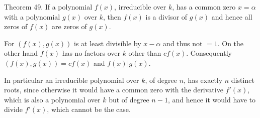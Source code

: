 Theorem 49. If a polynomial $f(x)$, irreducible over $k$, has a common zero $x = \alpha$ with a polynomial $g(x)$ over $k$, then $f(x)$ is a divisor of $g(x)$ and hence all zeros of $f(x)$ are zeros of $g(x)$.

For $(f(x), g(x))$ is at least divisible by $x - \alpha$ and thus not $= 1$. On the other hand $f(x)$ has no factors over $k$ other than $cf(x)$. Consequently $(f(x), g(x)) = cf(x)$ and $f(x)|g(x)$.

In particular an irreducible polynomial over $k$, of degree $n$, has exactly $n$ distinct roots, since otherwise it would have a common zero with the derivative $f'(x)$, which is also a polynomial over $k$ but of degree $n - 1$, and hence it would have to divide $f'(x)$, which cannot be the case.
